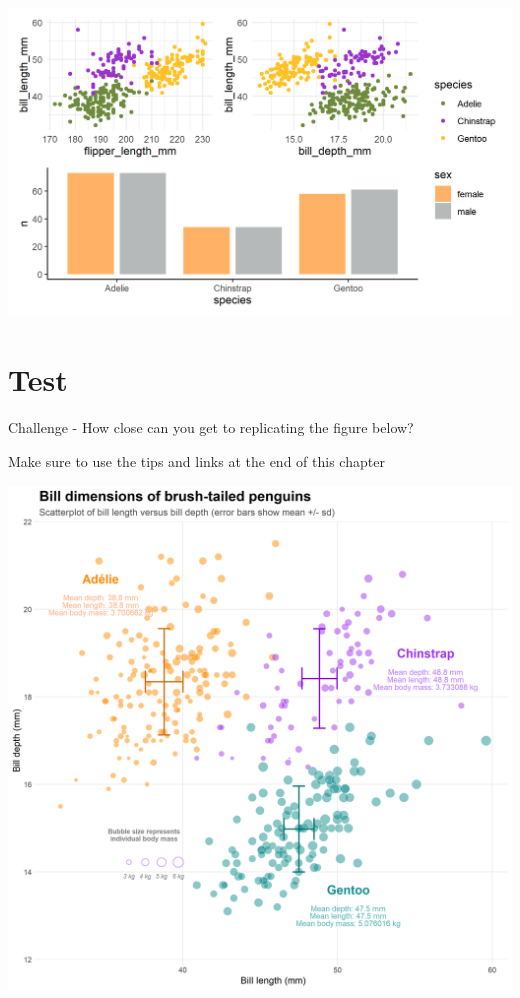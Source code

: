 \documentclass[
]{book}
\makeatletter
\newenvironment{kframe}{%
\medskip{}
\setlength{\fboxsep}{.8em}
 \def\at@end@of@kframe{}%
 \ifinner\ifhmode%
  \def\at@end@of@kframe{\end{minipage}}%
  \begin{minipage}{\columnwidth}%
 \fi\fi%
 \def\FrameCommand##1{\hskip\@totalleftmargin \hskip-\fboxsep
 \colorbox{shadecolor}{##1}\hskip-\fboxsep
     \hskip-\linewidth \hskip-\@totalleftmargin \hskip\columnwidth}%
 \MakeFramed {\advance\hsize-\width
   \@totalleftmargin\z@ \linewidth\hsize
   \@setminipage}}%
 {\par\unskip\endMakeFramed%
 \at@end@of@kframe}
\newenvironment{block}[1]
  {
  \begin{itemize}
  \renewcommand{\labelitemi}{
    \raisebox{-.7\height}[0pt][0pt]{
      {\setkeys{Gin}{width=3em,keepaspectratio}\texttt{[image: images/\#1]}}
    }
  }
  \setlength{\fboxsep}{1em}
  \begin{kframe}
  \item
  }
  {
  \end{kframe}
  \end{itemize}
  }
\newenvironment{rmdquestion}
  {\begin{block}{question}}
  {\end{block}}
\makeatother
\begin{document}
\includegraphics[width=0.9\linewidth]{images/patchwork}

\hypertarget{test}{%
\section{Test}\label{test}}

\begin{rmdquestion}
Challenge - How close can you get to replicating the figure below?

Make sure to use the tips and links at the end of this chapter
\end{rmdquestion}

\includegraphics[width=1\linewidth]{images/ambitious}
\end{document}

